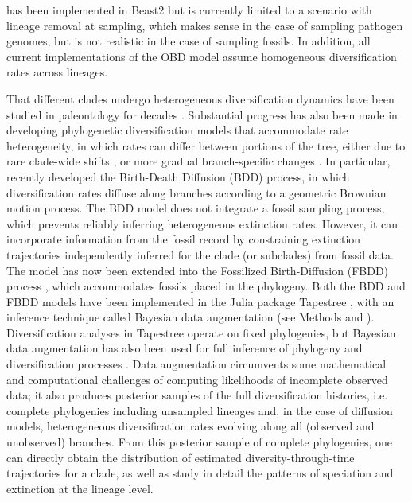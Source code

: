 \documentclass[oupdraft]{sysbio}
\newcommand{\revised}[1]{{\color{blue} #1}}
\begin{document}
\citep{zarebski_estimating_2025} has been implemented in Beast2 but is currently limited to a scenario with lineage removal at sampling, which makes sense in the case of sampling pathogen genomes, but is not realistic in the case of sampling fossils. In addition, all current implementations of the OBD model assume homogeneous diversification rates across lineages.

\revised{That different clades undergo heterogeneous diversification dynamics have been studied in paleontology for decades \citep[e.g.,][]{sepkoski_factor_1981}.} Substantial progress has also been made in developing \revised{phylogenetic} diversification models that accommodate rate heterogeneity, in which rates can differ between portions of the tree, either due to rare clade-wide shifts \citep{rabosky_automatic_2014, mitchell_inferring_2019, maddison_estimating_2007, caetano_hidden_2018}, or more gradual branch-specific changes \citep{maliet_model_2019, quintero_imbalanced_2024}. In particular, \citet{quintero_imbalanced_2024} recently developed the Birth-Death Diffusion (BDD) process, in which diversification rates diffuse along branches according to a geometric Brownian motion process. The BDD model does not integrate a fossil sampling process, which prevents reliably inferring heterogeneous extinction rates. However, it can incorporate information from the fossil record by constraining extinction trajectories independently inferred for the clade (or subclades) from fossil data. The model has now been extended into the Fossilized Birth-Diffusion (FBDD) process \citep{quintero_loss_2025}, which accommodates fossils placed in the phylogeny. Both the BDD and FBDD models have been implemented in the Julia package Tapestree \citep{quintero_tapestreejl_2020}, with an inference technique called Bayesian data augmentation (see Methods and \citet{tanner_calculation_1987, maliet_fast_2022}). Diversification analyses in Tapestree operate on fixed phylogenies, but Bayesian data augmentation has also been used for full inference of phylogeny and diversification processes \citep{barido-sottani_clads_2023, chabrol_fossilized_2025}. Data augmentation circumvents some mathematical and computational challenges of computing likelihoods of incomplete observed data; it also produces posterior samples of the full diversification histories, i.e. complete phylogenies including unsampled lineages and, in the case of diffusion models, heterogeneous diversification rates evolving along all (observed and unobserved) branches. From this posterior sample of complete phylogenies, one can directly obtain the distribution of estimated diversity-through-time trajectories for a clade, as well as study in detail the patterns of speciation and extinction at the lineage level.
\end{document}

